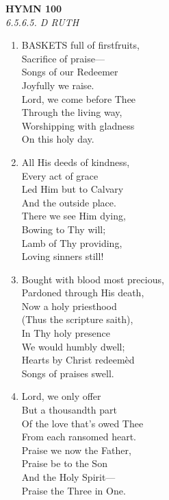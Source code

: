 \documentclass[11pt,a4paper]{article}
\begin{document}
\newpage
\begin{center}
    {\Large \textbf{HYMN 100\textdagger{}}}
    \\
    \textit{6.5.6.5. D RUTH}
\end{center}
\vspace{1em}

\begin{enumerate}
    \item BASKETS full of firstfruits, \\
        Sacrifice of praise--- \\
        Songs of our Redeemer \\
        Joyfully we raise. \\
        Lord, we come before Thee \\
        Through the living way, \\
        Worshipping with gladness \\
        On this holy day.

    \item All His deeds of kindness, \\
        Every act of grace \\
        Led Him but to Calvary \\
        And the outside place. \\
        There we see Him dying, \\
        Bowing to Thy will; \\
        Lamb of Thy providing, \\
        Loving sinners still!

    \item Bought with blood most precious, \\
        Pardoned through His death, \\
        Now a holy priesthood \\
        (Thus the scripture saith), \\
        In Thy holy presence \\
        We would humbly dwell; \\
        Hearts by Christ redeem\`ed \\
        Songs of praises swell.

    \item Lord, we only offer \\
        But a thousandth part \\
        Of the love that's owed Thee \\
        From each ransomed heart. \\
        Praise we now the Father, \\
        Praise be to the Son \\
        And the Holy Spirit--- \\
        Praise the Three in One.

\end{enumerate}
\end{document}
